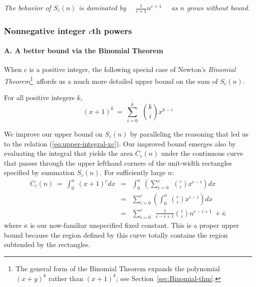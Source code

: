\smallskip

\begin{center}
{\em The behavior of $S_c(n)$ is dominated by \ \
  $\displaystyle \frac{1}{c+1} n^{c+1}$ \ \ as $n$ grows without bound.  }
\end{center}

\subsubsection{Nonnegative integer $c$th powers}
\label{sec:positive-integer-power}

\paragraph{A. A better bound via the Binomial Theorem}

When $c$ is a positive integer, the following special case of Newton's {\it Binomial Theorem}\footnote{The general form of the Binomial Theorem expands the polynomial $(x+y)^k$ rather than $(x+1)^k$; see Section~\ref{sec:Binomial-thm}.}~affords us a much more detailed upper bound on the sum of $S_c(n)$.

\begin{theorem}
\label{thm:restricted-binomial-thm}
For all positive integers $k$,
\begin{equation}
\label{eq:restricted-binomial-thm}
(x+1)^k \ = \ \sum_{i=0}^k \ \ {k \choose i} x^{k-i}
\end{equation}
\end{theorem}

We improve our upper bound on $S_c(n)$ by paralleling the reasoning that led us to the relation (\ref{eq:upper-integral-xc}).  Our improved bound emerges also by evaluating the integral that
yields the area $\overline{C}_c(n)$ under the continuous curve that passes through the upper lefthand corners of the unit-width rectangles specified by summation $S_c(n)$.  For sufficiently large $n$:
\begin{eqnarray}
\label{eq:upper-integral-xk}
\overline{C}_c(n) \ = \
\int_0^n \ (x+1)^c dx & = &
\int_0^n \ \left(\sum_{i=0}^c \ \ {c \choose i} x^{c-i} \right) dx \\
\nonumber
& = &
\sum_{i=0}^c \left( \int_0^n \  {c \choose i} x^{c-i} \right) dx \\
\nonumber
  & = &
\sum_{i=0}^c \ \ \frac{1}{c-i+1} {c \choose i} n^{c-i+1} \ + \overline{\kappa}
\end{eqnarray}
where $\overline{\kappa}$ is our now-familiar unspecified fixed constant.  This is a proper upper bound because the region defined by this curve totally contains the region subtended by the rectangles.

